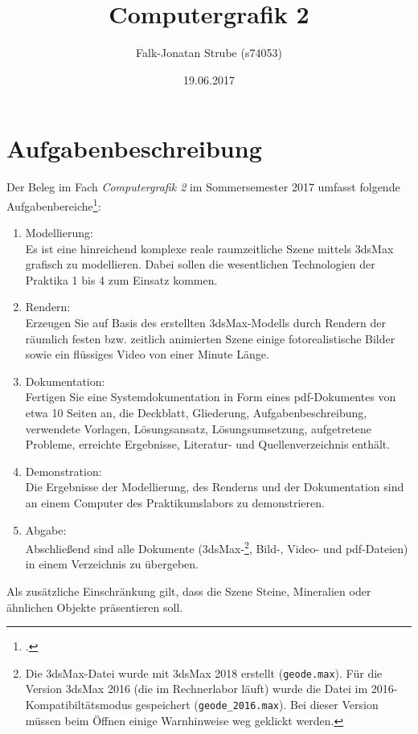 \documentclass{scrreprt}
\title{Computergrafik 2}
\author{Falk-Jonatan Strube (s74053)}
\date{19.06.2017}
\begin{document}
\maketitle
\tableofcontents

\chapter{Aufgabenbeschreibung}

Der Beleg im Fach \emph{Computergrafik 2} im Sommersemester 2017 umfasst folgende Aufgabenbereiche\footcite{Oertel2017}:
\begin{enumerate}
\item Modellierung:\label{aufg:model}\\
Es ist eine hinreichend komplexe reale raumzeitliche Szene mittels 3dsMax grafisch zu modellieren. Dabei sollen die wesentlichen Technologien der Praktika 1 bis 4 zum Einsatz kommen.
\item Rendern:\label{aufg:render}\\
Erzeugen Sie auf Basis des erstellten 3dsMax-Modells durch Rendern der räumlich festen bzw. zeitlich animierten Szene einige fotorealistische Bilder sowie ein flüssiges Video von einer Minute Länge.
\item Dokumentation:\label{aufg:doc}\\
Fertigen Sie eine Systemdokumentation in Form eines pdf-Dokumentes von etwa 10 Seiten an, die Deckblatt, Gliederung, Aufgabenbeschreibung, verwendete Vorlagen, Lösungsansatz, Lösungsumsetzung, aufgetretene Probleme, erreichte Ergebnisse, Literatur- und Quellenverzeichnis enthält.
\item Demonstration:\\
Die Ergebnisse der Modellierung, des Renderns und der Dokumentation sind an einem Computer des Praktikumslabors zu demonstrieren.
\item Abgabe:\\
Abschließend sind alle Dokumente (3dsMax-\footnote{Die 3dsMax-Datei wurde mit 3dsMax 2018 erstellt (\lstinline`geode.max`). Für die Version 3dsMax 2016 (die im Rechnerlabor läuft) wurde die Datei im 2016-Kompatibiltätsmodus gespeichert (\lstinline`geode_2016.max`). Bei dieser Version müssen beim Öffnen einige Warnhinweise weg geklickt werden.}, Bild-, Video- und pdf-Dateien) in einem Verzeichnis zu übergeben.
\end{enumerate}

Als zusätzliche Einschränkung gilt, dass die Szene Steine, Mineralien oder ähnlichen Objekte präsentieren soll.\bigskip
\end{document}
